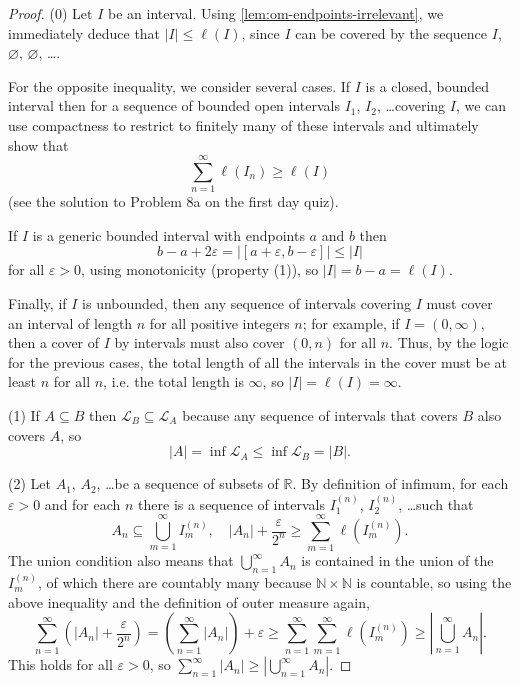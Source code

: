\documentclass[11pt]{scrartcl}
\providecommand{\eps}{\varepsilon}
\providecommand{\NN}{\mathbb N}
\providecommand{\RR}{\mathbb R}
\providecommand{\abs}[1]{\left\lvert #1\right\rvert}
\begin{document}
\begin{proof}
    (0) Let $I$ be an interval. Using \autoref{lem:om-endpoints-irrelevant},
    we immediately deduce that $|I|\le\ell(I)$,
    since $I$ can be covered by the sequence $I$, $\varnothing$, $\varnothing$, \dots.

    For the opposite inequality, we consider several cases.
    If $I$ is a closed, bounded interval then for a sequence of
    bounded open intervals $I_1$, $I_2$, \dots covering $I$,
    we can use compactness to restrict to finitely many of these intervals
    and ultimately show that
    \begin{equation*}
	\sum_{n=1}^\infty \ell(I_n) \ge \ell(I)
    \end{equation*}
    (see the solution to Problem 8a on the first day quiz).

    If $I$ is a generic bounded interval with endpoints $a$ and $b$ then
    \begin{equation*}
	b-a+2\eps = \abs{[a+\eps,b-\eps]} \le \abs I
    \end{equation*}
    for all $\eps > 0$, using monotonicity (property (1)),
    so $\abs I = b-a = \ell(I)$.

    Finally, if $I$ is unbounded, then any sequence of intervals covering $I$
    must cover an interval of length $n$ for all positive integers $n$;
    for example, if $I = (0,\infty)$, then a cover of $I$ by intervals
    must also cover $(0,n)$ for all $n$. Thus, by the logic for the previous cases,
    the total length of all the intervals in the cover must be at least $n$
    for all $n$, i.e. the total length is $\infty$, so $\abs I = \ell(I) = \infty$.

    (1) If $A\subseteq B$ then $\mathcal L_B\subseteq\mathcal L_A$
    because any sequence of intervals that covers $B$ also covers $A$, so
    \begin{equation*}
        |A| = \inf\mathcal L_A \le \inf\mathcal L_B = |B|.
    \end{equation*}

    (2) Let $A_1$, $A_2$, \dots be a sequence of subsets of $\RR$.
    By definition of infimum, for each $\eps > 0$
    and for each $n$ there is a sequence of intervals
    $I^{(n)}_1$, $I^{(n)}_2$, \dots such that
    \begin{equation*}
	A_n\subseteq \bigcup_{m=1}^\infty I^{(n)}_m,\quad
	\abs{A_n} + \frac{\eps}{2^n} \ge \sum_{m=1}^\infty \ell(I^{(n)}_m).
    \end{equation*}
    The union condition also means that $\bigcup_{n=1}^\infty A_n$
    is contained in the union of the $I_m^{(n)}$, of which there are countably many
    because $\NN\times\NN$ is countable, so
    using the above inequality and the definition of outer measure again,
    \begin{equation*}
	\sum_{n=1}^\infty \left(\abs{A_n} + \frac\eps{2^n}\right)
	= \left(\sum_{n=1}^\infty \abs{A_n}\right) + \eps
	\ge \sum_{n=1}^\infty \sum_{m=1}^\infty \ell(I_m^{(n)})
	\ge \abs{\bigcup_{n=1}^\infty A_n}.
    \end{equation*}
    This holds for all $\eps>0$, so
    $\sum_{n=1}^\infty\abs{A_n}\ge\abs{\bigcup_{n=1}^\infty A_n}$.


\end{proof}
\end{document}
